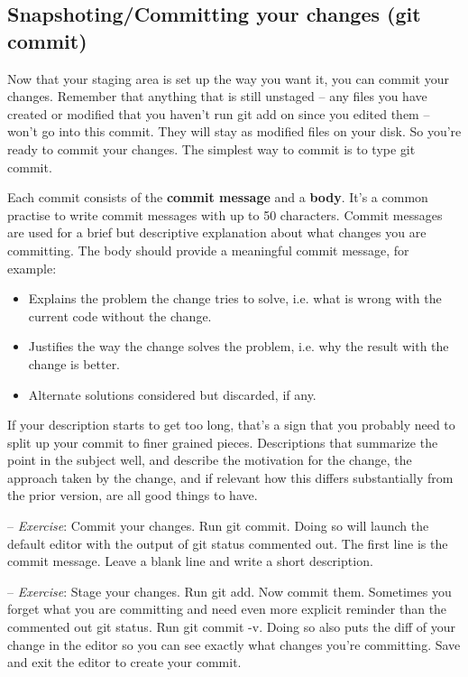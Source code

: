\documentclass[12pt,a4]{article}
\newcommand{\ilcode}[1]{\textcolor[RGB]{160, 110, 220}{#1}}
\begin{document}
\subsection{Snapshoting/Committing your changes (git commit)}
Now that your staging area is set up the way you want it, you can commit your
changes. Remember that anything that is still unstaged -- any files you have
created or modified that you haven’t run \ilcode{git add} on since you edited
them -- won’t go into this commit. They will stay as modified files on your
disk. So you’re ready to commit your changes. The simplest way to commit is to
type \ilcode{git commit}.

Each commit consists of the {\bf commit message} and a {\bf body}. It's a common
practise to write commit messages with up to 50 characters. Commit messages are
used for a brief but descriptive explanation about what changes you are
committing. The body should provide a meaningful commit message, for example:
\begin{itemize}
\item Explains the problem the change tries to solve, i.e. what is wrong with
	the current code without the change.
\item Justifies the way the change solves the problem, i.e. why the result with
	the change is better.
\item Alternate solutions considered but discarded, if any.
\end{itemize}
If your description starts to get too long, that’s a sign that you probably need
to split up your commit to finer grained pieces. Descriptions that summarize the
point in the subject well, and describe the motivation for the change, the
approach taken by the change, and if relevant how this differs substantially
from the prior version, are all good things to have.

{\sf -- \emph{Exercise}:} Commit your changes. Run \ilcode{git commit}. Doing so
will launch the default editor with the output of \ilcode{git status} commented
out. The first line is the commit message. Leave a blank line and write a short
description.

{\sf -- \emph{Exercise}:} Stage your changes. Run \ilcode{git add}. Now commit
them. Sometimes you forget what you are committing and need even more explicit
reminder than the commented out \ilcode{git status}. Run \ilcode{git commit -v}.
Doing so also puts the diff of your change in the editor so you can see exactly
what changes you're committing. Save and exit the editor to create your commit.
\end{document}
